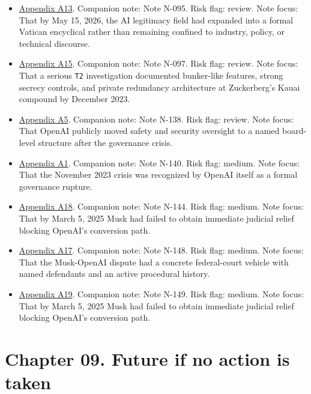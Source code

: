 \documentclass[
  american,
  11pt,
  letterpaper,
]{article}
\begin{document}
\begin{itemize}
  earlier investigation.
\item
  \hyperref[ch-08-appendix-a13-encyclical-letter-of-his-holiness-leo-xiv-magnifica-humanitas]{Appendix
  A13}. Companion note: Note N-095. Risk flag: review. Note focus: That
  by May 15, 2026, the AI legitimacy field had expanded into a formal
  Vatican encyclical rather than remaining confined to industry, policy,
  or technical discourse.
\item
  \hyperref[ch-08-appendix-a15-inside-mark-zuckerbergs-top-secret-hawaii-compound]{Appendix
  A15}. Companion note: Note N-097. Risk flag: review. Note focus: That
  a serious \texttt{T2} investigation documented bunker-like features,
  strong secrecy controls, and private redundancy architecture at
  Zuckerberg's Kauai compound by December 2023.
\item
  \hyperref[ch-08-appendix-a5-openai-board-forms-safety-and-security-committee]{Appendix
  A5}. Companion note: Note N-138. Risk flag: review. Note focus: That
  OpenAI publicly moved safety and security oversight to a named
  board-level structure after the governance crisis.
\item
  \hyperref[ch-08-appendix-a1-openai-announces-leadership-transition]{Appendix
  A1}. Companion note: Note N-140. Risk flag: medium. Note focus: That
  the November 2023 crisis was recognized by OpenAI itself as a formal
  governance rupture.
\item
  \hyperref[ch-08-appendix-a18-judge-denies-elon-musk-s-request-to-block-openai-for-profit-conversion-but-welcomes-trial]{Appendix
  A18}. Companion note: Note N-144. Risk flag: medium. Note focus: That
  by March 5, 2025 Musk had failed to obtain immediate judicial relief
  blocking OpenAI's conversion path.
\item
  \hyperref[ch-08-appendix-a17-musk-v-altman-4-24-cv-04722]{Appendix
  A17}. Companion note: Note N-148. Risk flag: medium. Note focus: That
  the Musk-OpenAI dispute had a concrete federal-court vehicle with
  named defendants and an active procedural history.
\item
  \hyperref[ch-08-appendix-a19-judge-denies-elon-musks-attempt-to-immediately-block-openais-conversion-to-for-profit-entity]{Appendix
  A19}. Companion note: Note N-149. Risk flag: medium. Note focus: That
  by March 5, 2025 Musk had failed to obtain immediate judicial relief
  blocking OpenAI's conversion path.
\end{itemize}

\newpage

\section{Chapter 09. Future if no action is
taken}\label{chapter-09.-future-if-no-action-is-taken}
\end{document}
